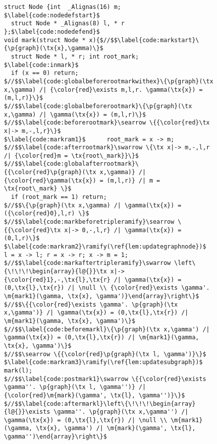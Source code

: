 \documentclass[acmsmall,review,anonymous]{acmart}\settopmatter{printfolios=true,printccs=false,printacmref=false}
\newcommand{\tx}[1]{\text{#1}}
\newcommand{\p}[1]{\ensuremath{\mathsf{#1}}} \newcommand{\m}[1]{\ensuremath{\mathit{#1}}} \newcommand{\ma}[1]{\ensuremath{\mathcal{#1}}} \let\ramify\lightning
\begin{document}

\begin{figure}[t]
\begin{lstlisting}[multicols=2]
struct Node {int  _Alignas(16) m; $\label{code:nodedefstart}$
  struct Node * _Alignas(8) l, * r };$\label{code:nodedefend}$
void mark(struct Node * x){$//$$\label{code:markstart}\{\p{graph}(\tx{x},\gamma)\}$
  struct Node * l, * r; int root_mark; $\label{code:inmark}$
  if (x == 0) return;
$//$$\label{code:globalbeforerootmarkwithex}\{\p{graph}(\tx x,\gamma) /| {\color{red}\exists m,l,r. \gamma(\tx{x}) = (m,l,r)}\}$
$//$$\label{code:globalbeforerootmark}\{\p{graph}(\tx x,\gamma) /| \gamma(\tx{x}) = (m,l,r)\}$
$//$$\label{code:beforerootmark}\searrow \{{\color{red}\tx x|-> m,-,l,r}\}$
$\label{code:markram1}$      root_mark = x -> m;
$//$$\label{code:afterrootmark}\swarrow \{\tx x|-> m,-,l,r /| {\color{red}m = \tx{root\_mark}}\}$
$//$$\label{code:globalafterrootmark}\{{\color{red}\p{graph}(\tx x,\gamma)} /| {\color{red}\gamma(\tx{x}) = (m,l,r)} /| m = \tx{root\_mark} \}$
  if (root_mark == 1) return;
$//$$\{\p{graph}(\tx x,\gamma) /| \gamma(\tx{x}) = ({\color{red}0},l,r) \}$
$//$$\label{code:markbeforetripleramify}\searrow \{{\color{red}\tx x|-> 0,-,l,r} /| \gamma(\tx{x}) = (0,l,r)\}$
$\label{code:markram2}\ramify(\ref{lem:updategraphnode})$  l = x -> l; r = x -> r; x -> m = 1;
$//$$\label{code:markaftertripleramify}\swarrow \left\{\!\!\!\begin{array}{l@{}}\tx x|-> {\color{red}1},-,\tx{l},\tx{r} /| \gamma(\tx{x}) = (0,\tx{l},\tx{r}) /| \null \\ {\color{red}\exists \gamma'. \m{mark1}(\gamma, \tx{x}, \gamma')}\end{array}\right\}$
$//$$\{{\color{red}\exists \gamma'. \p{graph}(\tx x,\gamma')} /| \gamma(\tx{x}) = (0,\tx{l},\tx{r}) /| \m{mark1}(\gamma, \tx{x}, \gamma')\}$
$//$$\label{code:beforemarkl}\{\p{graph}(\tx x,\gamma') /| \gamma(\tx{x}) = (0,\tx{l},\tx{r}) /| \m{mark1}(\gamma, \tx{x}, \gamma')\}$
$//$$\searrow \{{\color{red}\p{graph}(\tx l, \gamma')}\}$
$\label{code:markram3}\ramify(\ref{lem:updatesubgraph})$      mark(l);
$//$$\label{code:postmark1}\swarrow \{{\color{red}\exists \gamma''. \p{graph}(\tx l, \gamma'')} /| {\color{red}\m{mark}(\gamma', \tx{l}, \gamma'')}\}$
$//$$\label{code:aftermarkl}\left\{\!\!\!\begin{array}{l@{}}\exists \gamma''. \p{graph}(\tx x,\gamma'') /| \gamma(\tx{x}) = (0,\tx{l},\tx{r}) /| \null \\ \m{mark1}(\gamma, \tx{x}, \gamma') /| \m{mark}(\gamma', \tx{l}, \gamma'')\end{array}\right\}$

\end{lstlisting}
\end{figure}
\end{document}
